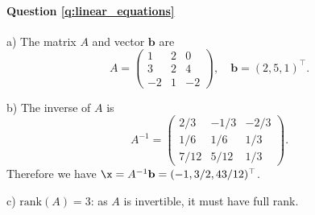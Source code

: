 \paragraph{Question \ref{q:linear_equations}}

a) The matrix $A$ and vector $\mathbf{b}$ are
\begin{equation*}
A = \begin{pmatrix}
1 & 2 & 0 \\
3 & 2 & 4 \\
-2 & 1 & -2
\end{pmatrix}, \quad \mathbf{b} = (2, 5, 1)^\top.
\end{equation*}

b) The inverse of $A$ is 
\begin{equation*}
A^{-1} = \begin{pmatrix}
2/3 & -1/3 & -2/3 \\
1/6 & 1/6 & 1/3 \\
7/12 & 5/12 & 1/3
\end{pmatrix}.
\end{equation*}
Therefore we have $\x = A^{-1} \mathbf{b} = (-1, 3/2, 43/12)^\top$.

c) $\text{rank}(A) = 3$: as $A$ is invertible, it must have full rank.